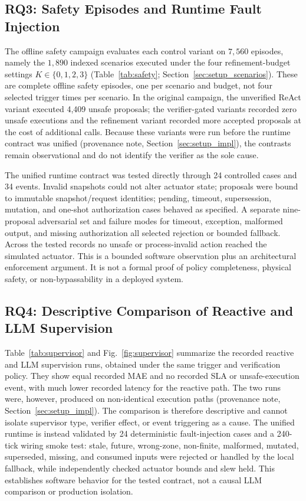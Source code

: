 \documentclass[smartcities,article,submit,moreauthors]{Definitions/mdpi}
\begin{document}
\subsection{RQ3: Safety Episodes and Runtime Fault Injection}
\label{sec:results_rq3}

The offline safety campaign evaluates each control variant on $7{,}560$
episodes, namely the $1{,}890$ indexed scenarios executed under the four
refinement-budget settings $K\in\{0,1,2,3\}$ (Table~\ref{tab:safety};
Section~\ref{sec:setup_scenarios}). These are complete offline safety
episodes, one per scenario and budget, not four selected trigger times per
scenario. In the original campaign, the unverified
ReAct variant executed 4,409 unsafe proposals; the verifier-gated variants
recorded zero unsafe executions and the refinement variant recorded more
accepted proposals at the cost of additional calls. Because these variants
were run before the runtime contract was unified (provenance note,
Section~\ref{sec:setup_impl}), the contrasts remain observational and do not
identify the verifier as the sole cause.

The unified runtime contract was tested directly through 24 controlled cases
and 34 events. Invalid snapshots could not alter actuator state; proposals were
bound to immutable snapshot/request identities; pending, timeout, supersession,
mutation, and one-shot authorization cases behaved as specified. A separate
nine-proposal adversarial set and failure modes for timeout, exception,
malformed output, and missing authorization all selected rejection or bounded
fallback. Across the tested records no unsafe or process-invalid action reached
the simulated actuator. This is a bounded software observation plus an
architectural enforcement argument. It is not a formal proof of policy
completeness, physical safety, or non-bypassability in a deployed system.



\subsection{RQ4: Descriptive Comparison of Reactive and LLM Supervision}
\label{sec:results_rq4}

Table~\ref{tab:supervisor} and Fig.~\ref{fig:supervisor} summarize the
recorded reactive and LLM supervision runs, obtained under the same trigger
and verification policy. They show equal recorded MAE and no recorded SLA or
unsafe-execution event, with much lower recorded latency for the reactive
path. The two runs were, however, produced on non-identical execution paths
(provenance note, Section~\ref{sec:setup_impl}). The comparison is therefore
descriptive and cannot isolate supervisor type, verifier effect, or event
triggering as a cause. The unified runtime is instead validated by 24 deterministic
fault-injection cases and a 240-tick wiring smoke test: stale, future,
wrong-zone, non-finite, malformed, mutated, superseded, missing, and consumed
inputs were rejected or handled by the local fallback, while independently
checked actuator bounds and slew held. This establishes software behavior for
the tested contract, not a causal LLM comparison or production isolation.
\end{document}
